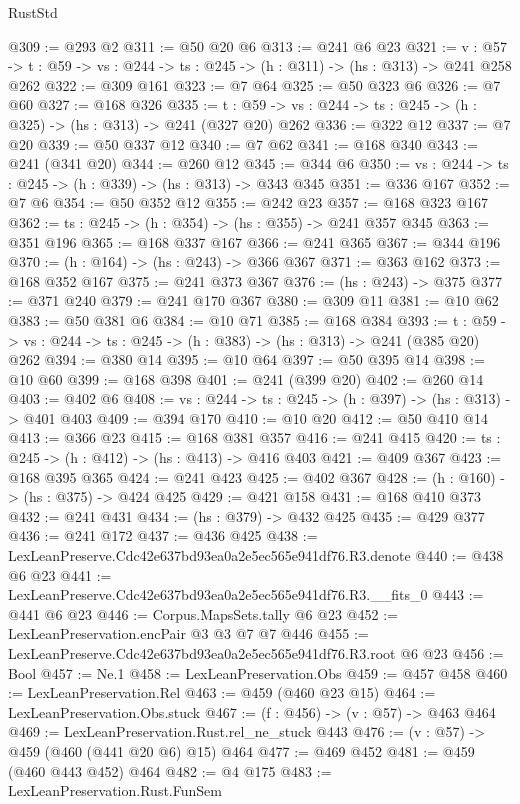 \begin{lexlean}{RustStd}
\begin{coremodule}
@309 := @293 @2
@311 := @50 @20 @6
@313 := @241 @6 @23
@321 := {v : @57} ->
  {t : @59} -> {vs : @244} -> {ts : @245} -> (h : @311) -> (hs : @313) -> @241 @258 @262
@322 := @309 @161
@323 := @7 @64
@325 := @50 @323 @6
@326 := @7 @60
@327 := @168 @326
@335 := {t : @59} -> {vs : @244} -> {ts : @245} -> (h : @325) -> (hs : @313) -> @241 (@327 @20) @262
@336 := @322 @12
@337 := @7 @20
@339 := @50 @337 @12
@340 := @7 @62
@341 := @168 @340
@343 := @241 (@341 @20)
@344 := @260 @12
@345 := @344 @6
@350 := {vs : @244} -> {ts : @245} -> (h : @339) -> (hs : @313) -> @343 @345
@351 := @336 @167
@352 := @7 @6
@354 := @50 @352 @12
@355 := @242 @23
@357 := @168 @323 @167
@362 := {ts : @245} -> (h : @354) -> (hs : @355) -> @241 @357 @345
@363 := @351 @196
@365 := @168 @337 @167
@366 := @241 @365
@367 := @344 @196
@370 := (h : @164) -> (hs : @243) -> @366 @367
@371 := @363 @162
@373 := @168 @352 @167
@375 := @241 @373 @367
@376 := (hs : @243) -> @375
@377 := @371 @240
@379 := @241 @170 @367
@380 := @309 @11
@381 := @10 @62
@383 := @50 @381 @6
@384 := @10 @71
@385 := @168 @384
@393 := {t : @59} -> {vs : @244} -> {ts : @245} -> (h : @383) -> (hs : @313) -> @241 (@385 @20) @262
@394 := @380 @14
@395 := @10 @64
@397 := @50 @395 @14
@398 := @10 @60
@399 := @168 @398
@401 := @241 (@399 @20)
@402 := @260 @14
@403 := @402 @6
@408 := {vs : @244} -> {ts : @245} -> (h : @397) -> (hs : @313) -> @401 @403
@409 := @394 @170
@410 := @10 @20
@412 := @50 @410 @14
@413 := @366 @23
@415 := @168 @381 @357
@416 := @241 @415
@420 := {ts : @245} -> (h : @412) -> (hs : @413) -> @416 @403
@421 := @409 @367
@423 := @168 @395 @365
@424 := @241 @423
@425 := @402 @367
@428 := (h : @160) -> (hs : @375) -> @424 @425
@429 := @421 @158
@431 := @168 @410 @373
@432 := @241 @431
@434 := (hs : @379) -> @432 @425
@435 := @429 @377
@436 := @241 @172
@437 := @436 @425
@438 := LexLeanPreserve.Cdc42e637bd93ea0a2e5ec565e941df76.R3.denote
@440 := @438 @6 @23
@441 := LexLeanPreserve.Cdc42e637bd93ea0a2e5ec565e941df76.R3.__fits_0
@443 := @441 @6 @23
@446 := Corpus.MapsSets.tally @6 @23
@452 := LexLeanPreservation.encPair @3 @3 @7 @7 @446
@455 := LexLeanPreserve.Cdc42e637bd93ea0a2e5ec565e941df76.R3.root @6 @23
@456 := Bool
@457 := Ne.{1}
@458 := LexLeanPreservation.Obs
@459 := @457 @458
@460 := LexLeanPreservation.Rel
@463 := @459 (@460 @23 @15)
@464 := LexLeanPreservation.Obs.stuck
@467 := (f : @456) -> (v : @57) -> @463 @464
@469 := LexLeanPreservation.Rust.rel_ne_stuck @443
@476 := (v : @57) -> @459 (@460 (@441 @20 @6) @15) @464
@477 := @469 @452
@481 := @459 (@460 @443 @452) @464
@482 := @4 @175
@483 := LexLeanPreservation.Rust.FunSem

\end{coremodule}
\end{lexlean}
